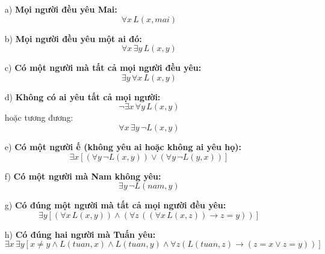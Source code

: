 \documentclass[11pt, oneside,openright,a4paper]{book}
\begin{document}
\begin{itemize}
    \item[a)] \textbf{Mọi người đều yêu Mai:}
    \[
    \forall x \, L(x, mai)
    \]

    \item[b)] \textbf{Mọi người đều yêu một ai đó:}
    \[
    \forall x \, \exists y \, L(x, y)
    \]

    \item[c)] \textbf{Có một người mà tất cả mọi người đều yêu:}
    \[
    \exists y \, \forall x \, L(x, y)
    \]

    \item[d)] \textbf{Không có ai yêu tất cả mọi người:}
    \[
    \neg \exists x \, \forall y \, L(x, y)
    \]
    hoặc tương đương:
    \[
    \forall x \, \exists y \, \neg L(x, y)
    \]

    \item[e)] \textbf{Có một người ế (không yêu ai hoặc không ai yêu họ):}
    \[
    \exists x \left[ \left( \forall y \, \neg L(x, y) \right) \lor \left( \forall y \, \neg L(y, x) \right) \right]
    \]

    \item[f)] \textbf{Có một người mà Nam không yêu:}
    \[
    \exists y \, \neg L(nam, y)
    \]

    \item[g)] \textbf{Có đúng một người mà tất cả mọi người đều yêu:}
    \[
    \exists y \left[ \left( \forall x \, L(x, y) \right) \land \left( \forall z \, \left( \left( \forall x \, L(x, z) \right) \rightarrow z = y \right) \right) \right]
    \]

    \item[h)] \textbf{Có đúng hai người mà Tuấn yêu:}
    \[
    \exists x \, \exists y \left[ x \ne y \land L(tuan, x) \land L(tuan, y) \land \forall z \left( L(tuan, z) \rightarrow (z = x \lor z = y) \right) \right]
    \]
\end{itemize}
\end{document}
